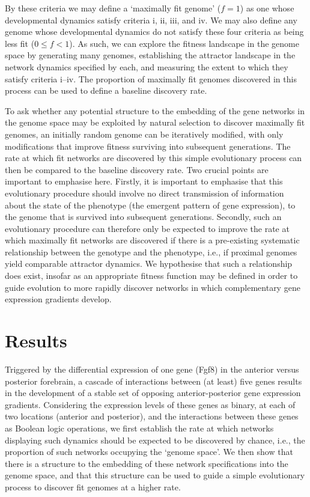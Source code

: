 \documentclass[10pt,letterpaper]{article}
\begin{document}
By these criteria we may define a `maximally fit genome' ($f=1$) as one whose developmental dynamics satisfy criteria i, ii, iii, and iv. We may also define any genome whose developmental dynamics do not satisfy these four criteria as being less fit ($0\leq f<1$). As such, we can explore the fitness landscape in the genome space by generating many genomes, establishing the attractor landscape in the network dynamics specified by each, and measuring the extent to which they satisfy criteria i--iv. The proportion of maximally fit genomes discovered in this process can be used to define a baseline discovery rate. 

To ask whether any potential structure to the embedding of the gene networks in the genome space may be exploited by natural selection to discover maximally fit genomes, an initially random genome can be iteratively modified, with only modifications that improve fitness surviving into subsequent generations. The rate at which fit networks are discovered by this simple evolutionary process can then be compared to the baseline discovery rate. Two crucial points are important to emphasise here. Firstly, it is important to emphasise that this evolutionary procedure should involve no direct transmission of information about the state of the phenotype (the emergent pattern of gene expression), to the genome that is survived into subsequent generations. Secondly, such an evolutionary procedure can therefore only be expected to improve the rate at which maximally fit networks are discovered if there is a pre-existing systematic relationship between the genotype and the phenotype, i.e., if proximal genomes yield comparable attractor dynamics. We hypothesise that such a relationship does exist, insofar as an appropriate fitness function may be defined in order to guide evolution to more rapidly discover networks in which complementary gene expression gradients develop.

\section*{Results}

Triggered by the differential expression of one gene (Fgf8) in the anterior versus posterior forebrain, a cascade of interactions between (at least) five genes results in the development of a stable set of opposing anterior-posterior gene expression gradients. Considering the expression levels of these genes as binary, at each of two locations (anterior and posterior), and the interactions between these genes as Boolean logic operations, we first establish the rate at which networks displaying such dynamics should be expected to be discovered by chance, i.e., the proportion of such networks occupying the `genome space'. We then show that there is a structure to the embedding of these network specifications into the genome space, and that this structure can be used to guide a simple evolutionary process to discover fit genomes at a higher rate.
\end{document}
